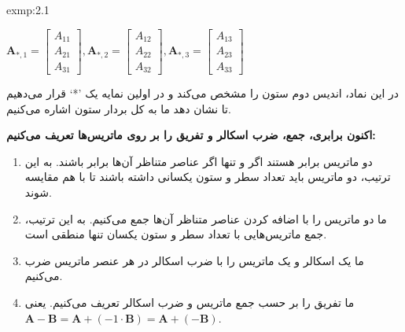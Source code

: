 {\begin{spacing}{1.5}
\begin{exmp}{exmp:2.1}
            \begin{center}
                $\textbf{A}_{*,1}=\begin{bmatrix}
                                      A_{11} \\
                                      A_{21} \\
                                      A_{31}
                \end{bmatrix},
                \textbf{A}_{*,2}=\begin{bmatrix}
                                     A_{12} \\
                                     A_{22} \\
                                     A_{32}
                \end{bmatrix},
                \textbf{A}_{*,3}=\begin{bmatrix}
                                     A_{13} \\
                                     A_{23} \\
                                     A_{33}
                \end{bmatrix}$
            \end{center}

            در این نماد، اندیس دوم ستون را مشخص می‌کند و در اولین نمایه یک ’*‘ قرار می‌دهیم تا نشان دهد ما به کل بردار ستون اشاره می‌کنیم.

            \textbf{اکنون برابری، جمع، ضرب اسکالر و تفریق را بر روی ماتریس‌ها تعریف می‌کنیم:}

            \begin{enumerate}[label=\textbf{\arabic*}.]
                \item {دو ماتریس برابر هستند اگر و تنها اگر عناصر متناظر آن‌ها برابر باشند.
                به این ترتیب، دو ماتریس باید تعداد سطر و ستون یکسانی داشته باشند تا با هم مقایسه شوند.}
                \item {ما دو ماتریس را با اضافه کردن عناصر متناظر آن‌ها جمع می‌کنیم.
                به این ترتیب، جمع ماتریس‌هایی با تعداد سطر و ستون یکسان تنها منطقی است.}
                \item {ما یک اسکالر و یک ماتریس را با ضرب اسکالر در هر عنصر ماتریس ضرب می‌کنیم.}
                \item {ما تفریق را بر حسب جمع ماتریس و ضرب اسکالر تعریف می‌کنیم. یعنی \\ $\textbf{A}-\textbf{B}=\textbf{A}+(-1\cdot\textbf{B})=\textbf{A}+(-\textbf{B})$.}
            \end{enumerate}
        \end{exmp}


\end{spacing}}
